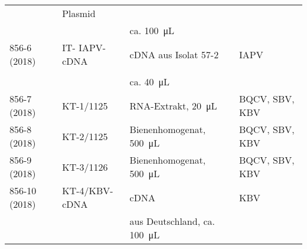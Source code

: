 \begin{table}[H]
\begin{tabular}{*{4}{l}}
                        & Plasmid               & \citep{blanchard2008}     &\\
                        &                       & ca. \SI{100}{\micro\liter} &\\ 
        856-6 (2018)    & IT- IAPV- cDNA        & cDNA aus Isolat 57-2      & IAPV\\
                        &                       & \citep{blanchard2008}     &\\
                        &                       & ca. \SI{40}{\micro\liter} &\\
        856-7 (2018)    & KT-1/1125             & RNA-Extrakt, \SI{20}{\micro\liter} & BQCV, SBV, KBV\\
        856-8 (2018)    & KT-2/1125             & Bienenhomogenat, \SI{500}{\micro\liter} & BQCV, SBV, KBV\\
        856-9 (2018)    & KT-3/1126             & Bienenhomogenat, \SI{500}{\micro\liter} & BQCV, SBV, KBV\\
        856-10 (2018)   & KT-4/KBV-cDNA         & cDNA \citep{siede2005}    & KBV\\
                        &                       & aus Deutschland, ca. \SI{100}{\micro\liter} &\\
        \bottomrule
    \end{tabular}
\end{table}